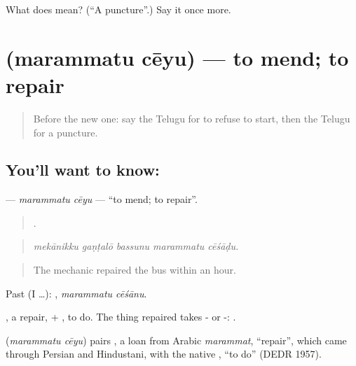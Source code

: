 \begin{tcolorbox}[breakable,colback=teal!4,colframe=teal!35!black,title={Before you move on}]
What does  mean? (\textquotedblleft{}A puncture\textquotedblright{}.) Say it once more.
\end{tcolorbox}
\section[\texorpdfstring{\te{మరమ్మతు} \te{చేయు} (marammatu cēyu)}{మరమ్మతు చేయు (marammatu cēyu)}]{  (marammatu cēyu) — to mend; to repair}

\label{lesson:TE-C444-marammatu-ceyu}



\begin{quote}
Before the new one: say the Telugu for to refuse to start, then the Telugu for a puncture.
\end{quote}

\subsection*{You'll want to know:  }
\textbf{ } — \emph{marammatu cēyu} — \textquotedblleft{}to mend; to repair\textquotedblright{}.

\begin{quote}
    .
\end{quote}

\begin{quote}
\emph{mekānikku gaṇṭalō bassunu marammatu cēśāḍu.}
\end{quote}

\begin{quote}
The mechanic repaired the bus within an hour.
\end{quote}

Past (I …):  , \emph{marammatu cēśānu}.

, a repair, + , to do. The thing repaired takes - or -: .

\begin{cousinweb}
\textbf{ } (\emph{marammatu cēyu}) pairs , a loan from Arabic \emph{marammat}, \textquotedblleft{}repair\textquotedblright{}, which came through Persian and Hindustani, with the native , \textquotedblleft{}to do\textquotedblright{} (DEDR 1957).
\end{cousinweb}

